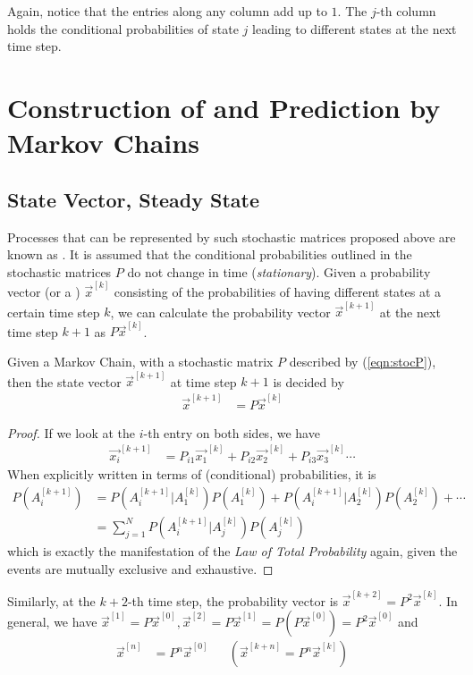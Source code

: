 Again, notice that the entries along any column add up to $1$. The $j$-th column holds the conditional probabilities of state $j$ leading to different states at the next time step.

\section{Construction of and Prediction by Markov Chains}

\subsection{State Vector, Steady State}

Processes that can be represented by such stochastic matrices proposed above are known as . It is assumed that the conditional probabilities outlined in the stochastic matrices $P$ do not change in time (\textit{stationary}). Given a probability vector (or a ) $\vec{x}^{[k]}$ consisting of the probabilities of having different states at a certain time step $k$, we can calculate the probability vector $\vec{x}^{[k+1]}$ at the next time step $k+1$ as $P\vec{x}^{[k]}$.

\begin{proper}
Given a Markov Chain, with a stochastic matrix $P$ described by (\ref{eqn:stocP}), then the state vector $\vec{x}^{[k+1]}$ at time step $k+1$ is decided by
\begin{align}
\vec{x}^{[k+1]} &= P\vec{x}^{[k]}   
\end{align}
\end{proper}
\begin{proof}
If we look at the $i$-th entry on both sides, we have
\begin{align*}
\vec{x_i}^{[k+1]} &= P_{i1} \vec{x_1}^{[k]} + P_{i2} \vec{x_2}^{[k]} + P_{i3} \vec{x_3}^{[k]} \cdots 
\end{align*}
When explicitly written in terms of (conditional) probabilities, it is
\begin{align*}
P(A_i^{[k+1]}) &= P(A_i^{[k+1]}|A_1^{[k]}) P(A_1^{[k]}) + P(A_i^{[k+1]}|A_2^{[k]}) P(A_2^{[k]}) + \cdots \\
&= \sum_{j=1}^N P(A_i^{[k+1]}|A_j^{[k]}) P(A_j^{[k]})
\end{align*}
which is exactly the manifestation of the \textit{Law of Total Probability} again, given the events are mutually exclusive and exhaustive.
\end{proof} 
Similarly, at the $k+2$-th time step, the probability vector is $\vec{x}^{[k+2]} = P^2\vec{x}^{[k]}$. In general, we have $\vec{x}^{[1]} = P\vec{x}^{[0]}, \vec{x}^{[2]} = P\vec{x}^{[1]} = P(P\vec{x}^{[0]}) = P^2\vec{x}^{[0]}$ and 
\begin{align}
\vec{x}^{[n]} &= P^n\vec{x}^{[0]} & & (\vec{x}^{[k+n]} = P^n\vec{x}^{[k]})  \label{eqn:markovpredict}
\end{align}

